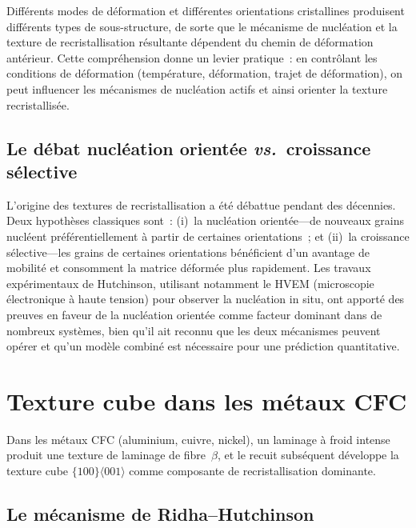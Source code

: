 \documentclass[11pt,a4paper]{article}
\begin{document}
Diff\'erents modes de d\'eformation et diff\'erentes orientations
cristallines produisent diff\'erents types de sous-structure, de sorte
que le m\'ecanisme de nucl\'eation et la texture de recristallisation
r\'esultante d\'ependent du chemin de d\'eformation ant\'erieur.  Cette
compr\'ehension donne un levier pratique~: en contr\^olant les conditions
de d\'eformation (temp\'erature, d\'eformation, trajet de d\'eformation),
on peut influencer les m\'ecanismes de nucl\'eation actifs et ainsi
orienter la texture recristallis\'ee.

\subsection{Le d\'ebat nucl\'eation orient\'ee \emph{vs.}\ croissance s\'elective}

L'origine des textures de recristallisation a \'et\'e d\'ebattue
pendant des d\'ecennies.  Deux hypoth\`eses classiques sont~:
(i)~la nucl\'eation orient\'ee---de nouveaux grains nucl\'eent
pr\'ef\'erentiellement \`a partir de certaines orientations~; et
(ii)~la croissance s\'elective---les grains de certaines orientations
b\'en\'eficient d'un avantage de mobilit\'e et consomment la matrice
d\'eform\'ee plus rapidement.  Les travaux exp\'erimentaux de
Hutchinson, utilisant notamment le HVEM (microscopie \'electronique \`a
haute tension) pour observer la nucl\'eation in situ, ont apport\'e des
preuves en faveur de la nucl\'eation orient\'ee comme facteur dominant
dans de nombreux syst\`emes, bien qu'il ait reconnu que les deux
m\'ecanismes peuvent op\'erer et qu'un mod\`ele combin\'e est
n\'ecessaire pour une pr\'ediction quantitative.

\section{Texture cube dans les m\'etaux CFC}
\label{sec:cube}

Dans les m\'etaux CFC (aluminium, cuivre, nickel), un laminage \`a froid
intense produit une texture de laminage de fibre~$\beta$, et le recuit
subs\'equent d\'eveloppe la texture cube
$\{100\}\langle 001\rangle$ comme composante de recristallisation
dominante.

\subsection{Le m\'ecanisme de Ridha--Hutchinson}
\end{document}

